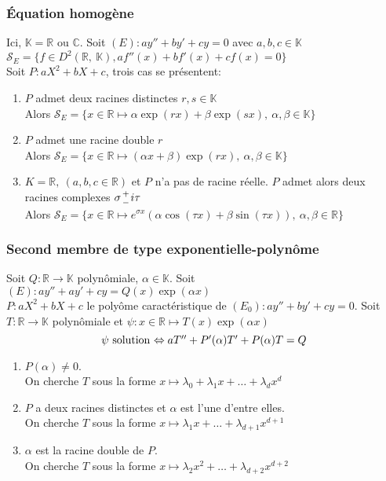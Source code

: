\documentclass[fleqn]{article}
\theoremstyle{definition} \newtheorem*{defi}{D\'efinition}
\theoremstyle{definition} \newtheorem*{theo}{Th\'eor\`eme}
\theoremstyle{remark} \newtheorem*{rqs}{Remarques}
\newcommand*{\bfrac}[2]{\genfrac{}{}{0pt}{}{#1}{#2}}
\begin{document}
\subsubsection{\'Equation homog\`ene}
Ici, $\mathbb{K} = \mathbb{R}$ ou $\mathbb{C}$. Soit $(E): ay'' + by' + cy = 0$ avec $a,b,c \in \mathbb{K}$\\
$\mathscr{S}_E = \{f \in D^2(\mathbb{R},\ \mathbb{K}), af''(x) + bf'(x) + cf(x) = 0\}$\\
Soit $P: aX^2 + bX + c$, trois cas se pr\'esentent:
\begin{enumerate}
	\item $P$ admet deux racines distinctes $r,s \in \mathbb{K}$ \\
		Alors $\mathscr{S}_E = \{x \in \mathbb{R} \mapsto \alpha \exp(rx) + \beta \exp(sx),\ \alpha, \beta \in \mathbb{K}\}$
	\item $P$ admet une racine double $r$\\
		Alors $\mathscr{S}_E = \{x \in \mathbb{R} \mapsto (\alpha x + \beta) \exp(rx),\ \alpha, \beta \in \mathbb{K}\}$
	\item $K = \mathbb{R},\ (a,b,c \in \mathbb{R})$ et $P$ n'a pas de racine r\'eelle. $P$ admet alors deux racines complexes
		$\sigma \bfrac{+}{-} i\tau$ \\
		Alors $\mathscr{S}_E = \{x \in \mathbb{R} \mapsto e^{\sigma x}(\alpha \cos(\tau x) + \beta \sin(\tau x)),\ \alpha, \beta \in \mathbb{R}\}$
\end{enumerate}

\subsubsection{Second membre de type exponentielle-polyn\^ome}
Soit $Q: \mathbb{R} \rightarrow \mathbb{K}$ polyn\^omiale, $\alpha \in \mathbb{K}$. Soit $(E): ay'' + ay' + cy = Q(x)\exp(\alpha x)$ \\
$P: aX^2 + bX + c$ le poly\^ome caract\'eristique de $(E_0): ay'' + by' + cy = 0$. Soit $T: \mathbb{R} \rightarrow \mathbb{K}$ polyn\^omiale
et $\psi: x \in \mathbb{R} \mapsto T(x) \exp(\alpha x)$
\[\psi$ solution $\Leftrightarrow aT'' + P'(\alpha)T' + P(\alpha)T = Q\]
\begin{enumerate}
	\item $P(\alpha) \neq 0$. \\
		On cherche $T$ sous la forme $x \mapsto \lambda_0 + \lambda_1 x + \hdots + \lambda_d x^d$
	\item $P$ a deux racines distinctes et $\alpha$ est l'une d'entre elles.\\
		On cherche $T$ sous la forme $x \mapsto \lambda_1 x + \hdots + \lambda_{d+1} x^{d+1}$
	\item $\alpha$ est la racine double de $P$.\\
		On cherche $T$ sous la forme $x \mapsto \lambda_2 x^2 + \hdots + \lambda_{d+2} x^{d+2}$
\end{enumerate}
\end{document}

